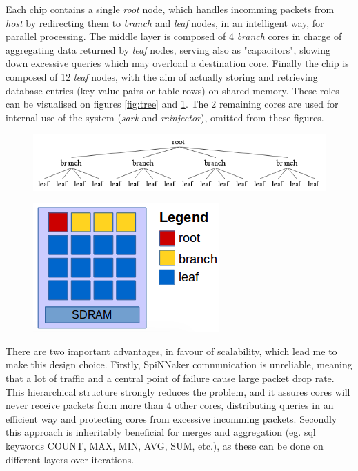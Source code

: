 Each chip contains a single \textit{root} node, which handles incomming packets from \textit{host} by redirecting them to \textit{branch} and \textit{leaf} nodes, in an intelligent way, for parallel processing. The middle layer is composed of 4 \textit{branch} cores in charge of aggregating data returned by \textit{leaf} nodes, serving also as "capacitors", slowing down excessive queries which may overload a destination core. Finally the chip is composed of 12 \textit{leaf} nodes, with the aim of actually storing and retrieving database entries (key-value pairs or table rows) on shared memory. These roles can be visualised on figures \ref{fig:tree} and \ref{fig:tree-chip}. The 2 remaining cores are used for internal use of the system (\textit{sark} and \textit{reinjector}), omitted from these figures.

\begin{figure}
\centering
\begin{minipage}{1\textwidth}
  \centering
  \includegraphics[width=0.9\linewidth, natwidth=618, natheight=120]{images/tree.png}
  \label{fig:tree}
\end{minipage}
\begin{minipage}{1\textwidth}
  \centering
  \includegraphics[width=0.5\linewidth, natwidth=270, natheight=186]{images/tree-chip.png}
  \label{fig:tree-chip}
\end{minipage}
\end{figure}

There are two important advantages, in favour of scalability, which lead me to make this design choice. Firstly, SpiNNaker communication is unreliable, meaning that a lot of traffic and a central point of failure cause large packet drop rate. This hierarchical structure strongly reduces the problem, and it assures cores will never receive packets from more than 4 other cores, distributing queries in an efficient way and protecting cores from excessive incomming packets. Secondly this approach is inheritably beneficial for merges and aggregation (eg. sql keywords COUNT, MAX, MIN, AVG, SUM, etc.), as these can be done on different layers over iterations. 

